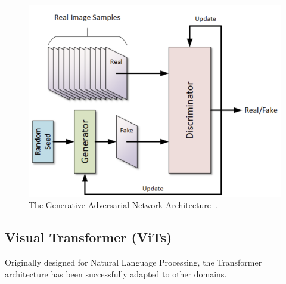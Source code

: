 \documentclass[12pt,a4paper]{report}
\begin{document}
\begin{figure}[th]
  \centering
  \includegraphics[scale=0.6]{./pics/gan.png}
  \caption[The Generative Adversarial Network Architecture]{The Generative Adversarial Network Architecture~\cite{gan-photo}.}
  \label{fig:pi6}
\end{figure}

\subsection{Visual Transformer (ViTs)}

Originally designed for Natural Language Processing, the Transformer~\cite{vaswani2017attention} architecture has been successfully adapted to other domains.
\end{document}
